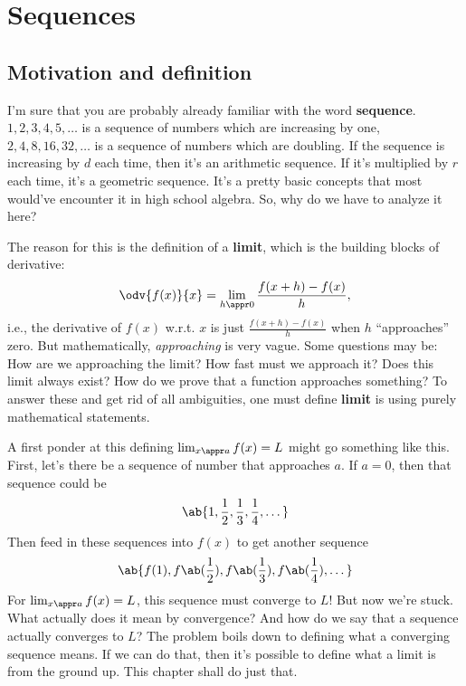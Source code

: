 \chapter{Sequences}

\section{Motivation and definition}

I'm sure that you are probably already familiar with the word \textbf{sequence}. $1, 2, 3, 4, 5, \dots$ is a sequence of numbers which are increasing by one, $2, 4, 8, 16, 32, \dots$ is a sequence of numbers which are doubling. If the sequence is increasing by $d$ each time, then it's an arithmetic sequence. If it's multiplied by $r$ each time, it's a geometric sequence. It's a pretty basic concepts that most would've encounter it in high school algebra. So, why do we have to analyze it here?

The reason for this is the definition of a \textbf{limit}, which is the building blocks of derivative:
\begin{equation}
  \odv{f(x)}{x} = \lim_{h \appr 0}\frac{f(x + h) - f(x)}{h},
\end{equation}
i.e., the derivative of $f(x)$ w.r.t. $x$ is just $\frac{f(x + h) - f(x)}{h}$ when $h$ \enquote{approaches} zero. But mathematically, \emph{approaching} is very vague. Some questions may be: How are we approaching the limit? How fast must we approach it? Does this limit always exist? How do we prove that a function approaches something? To answer these and get rid of all ambiguities, one must define \textbf{limit} is using purely mathematical statements.

A first ponder at this defining $\lim_{x \appr a}f(x) = L$ might go something like this. First, let's there be a sequence of number that approaches $a$. If $a = 0$, then that sequence could be
\begin{equation*}
  \ab\{1, \frac{1}{2}, \frac{1}{3}, \frac{1}{4}, \dots\}
\end{equation*}
Then feed in these sequences into $f(x)$ to get another sequence
\begin{equation*}
  \ab\{f(1), f\ab(\frac{1}{2}), f\ab(\frac{1}{3}), f\ab(\frac{1}{4}), \dots\}
\end{equation*}
For $\lim_{x \appr a}f(x) = L$, this sequence must converge to $L$! But now we're stuck. What actually does it mean by convergence? And how do we say that a sequence actually converges to $L$? The problem boils down to defining what a converging sequence means. If we can do that, then it's possible to define what a limit is from the ground up. This chapter shall do just that.

